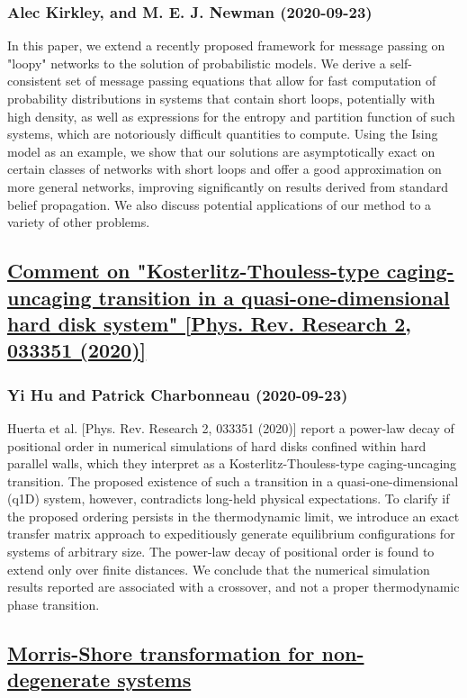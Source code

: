 \subsubsection*{Alec Kirkley, and M. E. J. Newman (2020-09-23)}
In this paper, we extend a recently proposed framework for message passing on
"loopy" networks to the solution of probabilistic models. We derive a
self-consistent set of message passing equations that allow for fast
computation of probability distributions in systems that contain short loops,
potentially with high density, as well as expressions for the entropy and
partition function of such systems, which are notoriously difficult quantities
to compute. Using the Ising model as an example, we show that our solutions are
asymptotically exact on certain classes of networks with short loops and offer
a good approximation on more general networks, improving significantly on
results derived from standard belief propagation. We also discuss potential
applications of our method to a variety of other problems.

\subsection*{\href{http://arxiv.org/abs/2009.11194v1}{Comment on "Kosterlitz-Thouless-type caging-uncaging transition in a  quasi-one-dimensional hard disk system" [Phys. Rev. Research 2, 033351  (2020)]}}
\subsubsection*{Yi Hu and Patrick Charbonneau (2020-09-23)}
Huerta et al. [Phys. Rev. Research 2, 033351 (2020)] report a power-law decay
of positional order in numerical simulations of hard disks confined within hard
parallel walls, which they interpret as a Kosterlitz-Thouless-type
caging-uncaging transition. The proposed existence of such a transition in a
quasi-one-dimensional (q1D) system, however, contradicts long-held physical
expectations. To clarify if the proposed ordering persists in the thermodynamic
limit, we introduce an exact transfer matrix approach to expeditiously generate
equilibrium configurations for systems of arbitrary size. The power-law decay
of positional order is found to extend only over finite distances. We conclude
that the numerical simulation results reported are associated with a crossover,
and not a proper thermodynamic phase transition.

\subsection*{\href{http://arxiv.org/abs/2009.11191v1}{Morris-Shore transformation for non-degenerate systems}}

